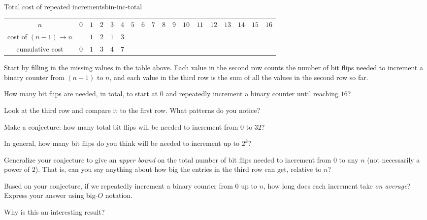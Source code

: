 \documentclass{tufte-handout}
\begin{document}
\pause

\begin{model*}{Total cost of repeated increments}{bin-inc-total}
  \centering
  \begin{tabular}{c|ccccccccccccccccc}
    $n$ & $0$ & $1$ & $2$ & $3$ & $4$ & $5$ & $6$ & $7$ & $8$ & $9$ & $10$
    & $11$ & $12$ & $13$ & $14$ & $15$ & $16$ \\[8pt]
    cost of $(n-1) \to n$ &  & $1$ & $2$ & $1$ & $3$ & &  &  &  &  &
    &  &  &  &  &  &  \\[8pt]
    cumulative cost & $0$ & $1$ & $3$ & $4$ & $7$ &  &  &  &
    &  &  &  &  &  &  &  &
  \end{tabular}
\end{model*}

\begin{questions}
\item Start by filling in the missing values in the table above. Each
  value in the second row counts the number of bit flips needed to
  increment a binary counter from $(n-1)$ to $n$, and each value in
  the third row is the sum of all the values in the second row so far.
  \item How many bit flips are needed, in total, to start at $0$ and
    repeatedly increment a binary counter until reaching $16$?
  \item Look at the third row and compare it to the first row.  What
    patterns do you notice?
  \item Make a conjecture: how many total bit flips will be needed to
    increment from $0$ to $32$?
  \item In general, how many bit flips do you think will be needed to
    increment up to $2^k$?
  \item \label{q:upper-bound} Generalize your conjecture to give an
    \emph{upper bound} on the total number of bit flips needed to
    increment from $0$ to any $n$ (not necessarily a power of $2$).
    That is, can you say anything about how big the entries in the
    third row can get, relative to $n$?
  \item Based on your conjecture, if we repeatedly increment a binary
    counter from $0$ up to $n$, how long does each increment take
    \emph{on average}?  Express your answer using big-$O$ notation.
  \item Why is this an interesting result?
\end{questions}
\end{document}
